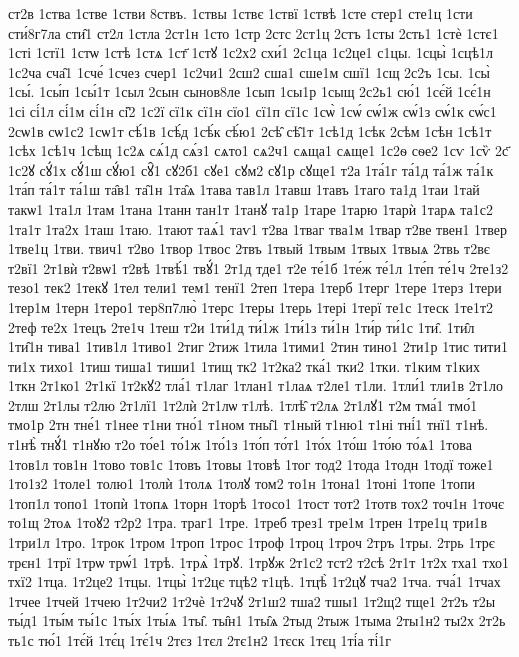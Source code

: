 {ст2в
1ства
1стве
1стви
8ствъ.
1ствы
1ствє
1ствї
1ствѣ
1сте
стер1
сте1ц
1сти
сти́8г7ла
сти̑1
ст2л
1стла
2ст1н
1сто
1стр
2стс
2ст1ц
2стъ
1сты
2сть1
1стѐ
1стє1
1сті
1стї1
1стѡ
1стѣ
1стѧ
1ст҃
1стꙋ
1с2х2
схи́1
2с1ца
1с2це1
с1цы.
1сцы̀
1сцѣ1л
1с2ча
сча̑1
1сче́
1счез
счер1
1с2чи1
2сш2
сша1
сше1м
сшї1
1сщ
2с2ъ
1сы.
1сы̀
1сы́.
1сы́п
1сы́1т
1сыл
2сын
сынов8ле
1сып
1сы1р
1сыщ
2с2ь1
сю́1
1сє́й
1сє́1н
1сі
сі́1л
сі́1м
сі́1н
сі̑2
1с2ї
сї1к
сї1н
сїо1
сї1п
сї1с
1сѡ̀
1сѡ́
сѡ́1ж
сѡ́1з
сѡ́1к
сѡ́с1
2сѡ1в
сѡ1с2
1сѡ1т
сѣ́1в
1сѣ́д
1сѣ́к
сѣ́ю1
2сѣ̑
сѣ̑1т
1сѣ1д
1сѣк
2сѣм
1сѣн
1сѣ1т
1сѣх
1сѣ1ч
1сѣщ
1с2ѧ
сѧ́1д
сѧ́з1
сѧто1
сѧ2ч1
сѧща1
сѧще1
1с2ѳ
сѳе2
1сѵ
1сѷ
2с҃
1с2ꙋ
сꙋ́1х
сꙋ́1ш
сꙋ́ю1
сꙋ̑1
сꙋ2б1
сꙋе1
сꙋм2
сꙋ1р
сꙋще1
т2а
1та́1г
та́1д
та́1ж
та́1к
1та́п
та́1т
та́1ш
та̑в1
та̑1н
1та̑ѧ
1тава
тав1л
1тавш
1тавъ
1таго
та1д
1таи
1тай
такѡ1
1та1л
1там
1тана
1танн
тан1т
1танꙋ
та1р
1таре
1тарю
1тарѝ
1тарѧ
та1с2
1та1т
1та2х
1таш
1таю.
1тают
таѧ́1
таѵ1
т2ва
1тваг
тва1м
1твар
т2ве
твен1
1твер
1тве1ц
1тви.
твич1
т2во
1твор
1твос
2твъ
1твый
1твым
1твых
1твыѧ
2твь
т2вє
т2вї1
2т1вѝ
т2вѡ1
т2вѣ
1твѣ́1
твꙋ́1
2т1д
тде1
т2е
те́1б
1те́ж
те́1л
1те́п
те́1ч
2те1з2
тезо1
тек2
1текꙋ
1тел
тели1
тем1
тенї1
2теп
1тера
1терб
1терг
1тере
1терз
1тери
1тер1м
1терн
1теро1
тер8п7лю̀
1терс
1теры
1терь
1тері
1терї
те1с
1теск
1те1т2
2теф
те2х
1тецъ
2те1ч
1теш
т2и
1ти́1д
ти́1ж
1ти́1з
ти́1н
1ти́р
ти́1с
1ти̑.
1ти̑л
1ти̑1н
тива1
1тив1л
1тиво1
2тиг
2тиж
1тила
1тими1
2тин
тино1
2ти1р
1тис
тити1
ти1х
тихо1
1тиш
тиша1
тиши1
1тищ
тк2
1т2ка2
тка́1
тки2
1тки.
т1ким
т1ких
1ткн
2т1ко1
2т1кї
1т2кꙋ2
тла́1
т1лаг
1тлан1
т1лаѧ
т2ле1
т1ли.
1тли́1
тли1в
2т1ло
2тлш
2т1лы
т2лю
2т1лї1
1т2лѝ
2т1лѡ
т1лѣ.
1тлѣ̑
т2лѧ
2т1лꙋ1
т2м
тма́1
тмо́1
тмо1р
2тн
тне́1
т1нее
т1ни
тно́1
т1ном
тны̑1
т1ный
т1ню1
т1ні
тні́1
тнї1
т1нѣ.
т1нѣ̀
тнꙋ́1
т1нꙋю
т2о
то́е1
то́1ж
1то́1з
1то́п
то́т1
1то́х
1то́ш
1то́ю
то́ѧ1
1това
1тов1л
тов1н
1тово
тов1с
1товъ
1товы
1товѣ
1тог
тод2
1тода
1тодн
1тодї
тоже1
1то1з2
1толе1
толю1
1толѝ
1толѧ
1толꙋ
том2
то1н
1тона1
1тоні
1топе
1топи
1топ1л
топо1
1топѝ
1топѧ
1торн
1торѣ
1тосо1
1тост
тот2
1тотв
тох2
точ1н
1точє
то1щ
2тоѧ
1тоꙋ2
т2р2
1тра.
траг1
1тре.
1треб
трез1
тре1м
1трен
1тре1ц
три1в
1три1л
1тро.
1трок
1тром
1троп
1трос
1троф
1троц
1троч
2тръ
1тры.
2трь
1трє
трєн1
1трї
1трѡ
трѡ́1
1трѣ.
1трѧ̀
1трꙋ.
1трꙋж
2т1с2
тст2
т2сѣ
2т1т
1т2х
тха1
тхо1
тхї2
1тца.
1т2це2
1тцы.
1тцы̀
1т2цє
тцѣ2
т1цѣ.
1тцѣ̀
1т2цꙋ
тча2
1тча.
тча́1
1тчах
1тчее
1тчей
1тчею
1т2чи2
1т2чѐ
1т2чꙋ
2т1ш2
тша2
тшы1
1т2щ2
тще1
2т2ъ
т2ы
ты́д1
1ты́м
ты́1с
1ты́х
1ты́ѧ
1ты̑.
ты̑н1
1ты̑ѧ
2тыд
2тыж
1тыма
2ты1н2
ты2х
2т2ь
ть1с
тю́1
1тє́й
1тє́ц
1тє́1ч
2тєз
1тєл
2тє1н2
1тєск
1тєц
1ті́а
ті́1г
}
